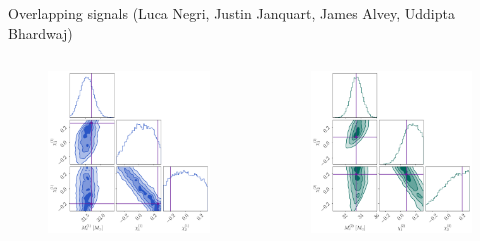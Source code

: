 \documentclass[usenames,dvipsnames,t]{beamer}
\begin{document}
\begin{frame}{Overlapping signals \tiny (Luca Negri, Justin Janquart, James Alvey, Uddipta Bhardwaj) \normalsize}
{    \vspace{-3mm}
    \begin{columns}
      \begin{column}{0.49\textwidth}
        \begin{figure}
          \centering
          \includegraphics[width=0.80\linewidth]{Figures/OS_injection_139_1_cornerplot_M_c_s1_z_s2_z.pdf}
        \end{figure}
      \end{column}

      \begin{column}{0.49\textwidth}
        \begin{figure}
          \centering
          \includegraphics[width=0.80\linewidth]{Figures/OS_injection_139_2_cornerplot_M_c_s1_z_s2_z.pdf}
        \end{figure}
      \end{column}
    \end{columns}
  }
\end{frame}
\end{document}
